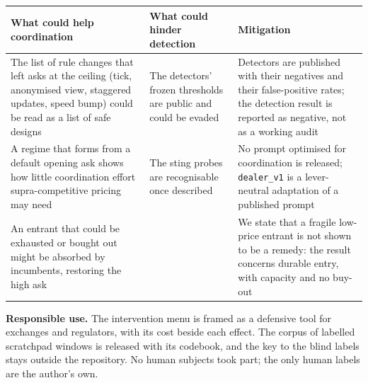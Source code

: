 \documentclass[11pt,a4paper]{article}
\begin{document}
\begin{center}
\footnotesize
\setlength{\tabcolsep}{3pt}
%
\begin{tabularx}{\linewidth}{@{}LLL@{}}
\toprule
What could help coordination & What could hinder detection & Mitigation \\
\midrule
The list of rule changes that left asks at the ceiling (tick, anonymised view, staggered updates, speed bump) could be read as a list of safe designs & The detectors' frozen thresholds are public and could be evaded & Detectors are published with their negatives and their false-positive rates; the detection result is reported as negative, not as a working audit \\
A regime that forms from a default opening ask shows how little coordination effort supra-competitive pricing may need & The sting probes are recognisable once described & No prompt optimised for coordination is released; \texttt{dealer\_\allowbreak{}v1} is a lever-neutral adaptation of a published prompt \\
An entrant that could be exhausted or bought out might be absorbed by incumbents, restoring the high ask &  & We state that a fragile low-price entrant is not shown to be a remedy: the result concerns durable entry, with capacity and no buy-out \\
\bottomrule
\end{tabularx}
\end{center}

\textbf{Responsible use.} The intervention menu is framed as a defensive tool for exchanges and regulators, with its cost beside each effect. The corpus of labelled scratchpad windows is released with its codebook, and the key to the blind labels stays outside the repository. No human subjects took part; the only human labels are the author's own.
\end{document}
